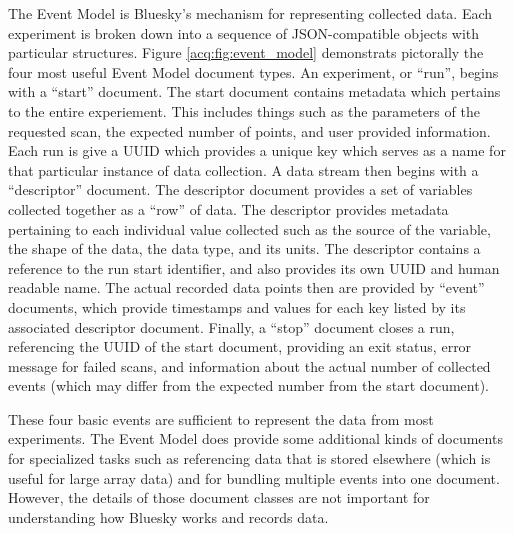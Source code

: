 The Event Model\cite{} is Bluesky's mechanism for representing collected data.
Each experiment is broken down into a sequence of JSON-compatible objects with particular structures.
Figure \ref{acq:fig:event_model} demonstrats pictorally the four most useful Event Model document types.
An experiment, or ``run'', begins with a ``start'' document.
The start document contains metadata which pertains to the entire experiement.
This includes things such as the parameters of the requested scan, the expected number of points, and user provided information.
Each run is give a \Gls{UUID} which provides a unique key which serves as a name for that particular instance of data collection.
A data stream then begins with a ``descriptor'' document.
The descriptor document provides a set of variables collected together as a ``row'' of data.
The descriptor provides metadata pertaining to each individual value collected such as the source of the variable, the shape of the data, the data type, and its units.
The descriptor contains a reference to the run start identifier, and also provides its own \Gls{UUID} and human readable name.
The actual recorded data points then are provided by ``event'' documents, which provide timestamps and values for each key listed by its associated descriptor document.
Finally, a ``stop'' document closes a run, referencing the UUID of the start document, providing an exit status, error message for failed scans, and information about the actual number of collected events (which may differ from the expected number from the start document).

These four basic events are sufficient to represent the data from most experiments.
The Event Model does provide some additional kinds of documents for specialized tasks such as referencing data that is stored elsewhere (which is useful for large array data) and for bundling multiple events into one document.
However, the details of those document classes are not important for understanding how Bluesky works and records data.


